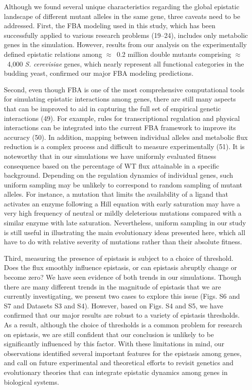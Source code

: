 Although we found several unique characteristics regarding the global
epistatic landscape of different mutant alleles in the same gene,
three caveats need to be addressed. First, the FBA modeling used in
this study, which has been successfully applied to various research
problems (19–24), includes only metabolic genes in the
simulation. However, results from our analysis on the experimentally
defined epistatic relations among $\approx$~0.2 million double mutants
comprising $\approx$~4,000 \textit{S. cerevisiae} genes, which nearly
represent all functional categories in the budding yeast, confirmed
our major FBA modeling predictions.

Second, even though FBA is one of the most comprehensive computational
tools for simulating epistatic interactions among genes, there are
still many aspects that can be improved to aid in capturing the full
set of empirical genetic interactions (49). For example, rules for
transcriptional regulation and physical interactions can be integrated
into the current FBA framework to improve its accuracy (50). In
addition, mapping between individual alleles and metabolic flux
reduction is a complex process and difficult to measure experimentally
(51). It is noteworthy that in our simulations we have uniformly
evaluated fitness consequence based on the percentage of WT flux
attainable in a specific background. Depending on the regulation
dynamics of individual genes, such uniform sampling may be unlikely to
correspond to random sampling of mutant alleles. For instance, a
mutation that limits the availability of a ligand that activates an
enzyme following a Hill equation with early saturation may have a very
high frequency of neutral or mildly deleterious mutations compared
with a similar enzyme with late saturation. Nevertheless, uniform
sampling in our study is still useful in illustrating the main
evolutionary ideas presented here, which all have to do with relative
severity of mutations rather than their absolute fitness.

Third, measuring the presence of epistasis is subject to a choice of
threshold. Does the flux smoothly influence epistasis, or can
epistasis abruptly change or become zero? We have seen evidence of
both trends in our simulations. Though there are many different trends
in the magnitude of epistasis that we are currently investigating, we
present two cases to explore this issue (Figs. S6 and S7 and Datasets
S3 and S4). However, based on Figs. S4 and S5, we have confirmed that
our major results are robust to a variety of epistasis thresholds. As
a result, although the choice of thresholds is a common problem for
research on epistasis, we are still confident that our conclusion is
unlikely to be significantly influenced by this factor. With these
limitations in mind, our observations identified several important
features for the epistasis among genes, and call on future
experimental and theoretical efforts to revisit genetics and
evolutionary theories that can integrate epistatic dynamics among
genes in biological systems.

